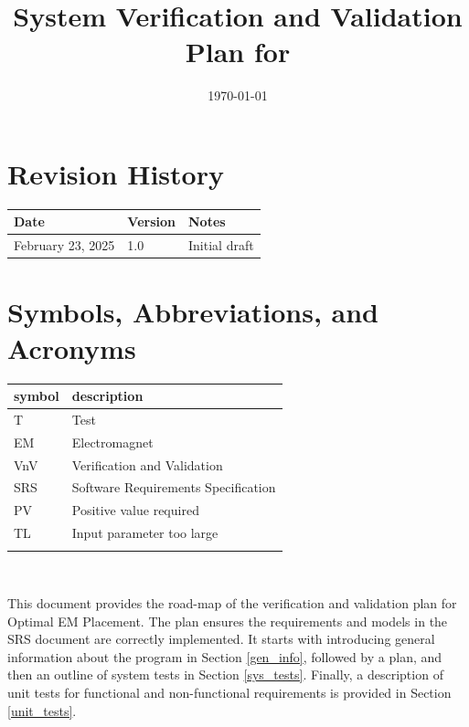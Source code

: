 \documentclass[12pt, titlepage]{article}
\begin{document}
\title{System Verification and Validation Plan for \progname{}} 
\author{\authname}
\date{\today}
	
\maketitle


\section*{Revision History}

\begin{tabularx}{\textwidth}{p{3.5cm}p{2cm}X}
\toprule {\bf Date} & {\bf Version} & {\bf Notes}\\
\midrule
February 23, 2025 & 1.0 & Initial draft\\
\bottomrule
\end{tabularx}


\newpage

\tableofcontents
\newpage

\section{Symbols, Abbreviations, and Acronyms}

\renewcommand{\arraystretch}{1.2}
\begin{tabular}{l l} 
  \toprule		
  \textbf{symbol} & \textbf{description}\\
  \midrule 
  T & Test\\
  EM & Electromagnet\\
  VnV & Verification and Validation \\
  SRS & Software Requirements Specification \\
  PV & Positive value required \\
  TL & Input parameter too large \\
  \bottomrule
  \label{abbrevs}
\end{tabular}\\

\newpage


This document provides the road-map of the verification and validation plan for Optimal EM Placement. The plan ensures the requirements and models in the SRS document are correctly implemented. It starts with introducing general information about the program in Section \ref{gen_info}, followed by a plan, and then an outline of system tests in Section \ref{sys_tests}. Finally, a description of unit tests for functional and non-functional requirements is provided in Section \ref{unit_tests}.
\end{document}

